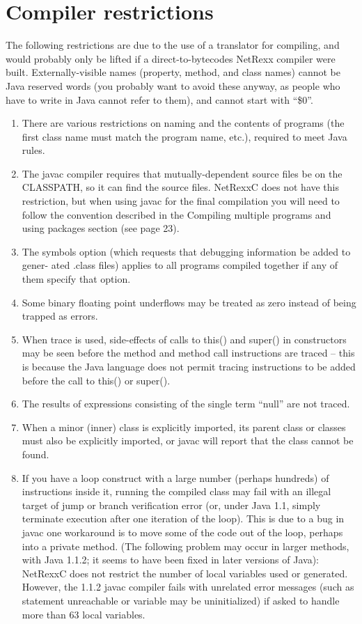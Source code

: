 \section{Compiler restrictions }
The following restrictions are due to the use of a translator for compiling, and would probably only be lifted if a direct-to-bytecodes NetRexx compiler were built. 
Externally-visible names (property, method, and class names) cannot be Java reserved words (you probably want to avoid these anyway, as people who have to write in Java cannot refer to them), and cannot start with “\$0”.
\begin{enumerate}
\item There are various restrictions on naming and the contents of programs (the first class name must match the program name, etc.), required to meet Java rules. 
\item The javac compiler requires that mutually-dependent source files be on the CLASSPATH, so it can find the source files. NetRexxC does not have this restriction, but when using javac for the final compilation you will need to follow the convention described in the Compiling multiple programs and using packages section (see page 23). 
\item The symbols option (which requests that debugging information be added to gener- ated .class files) applies to all programs compiled together if any of them specify that option. 
\item Some binary floating point underflows may be treated as zero instead of being trapped as errors. 
\item When trace is used, side-effects of calls to this() and super() in constructors may be seen before the method and method call instructions are traced – this is because the Java language does not permit tracing instructions to be added before the call to this() or super(). 
\item The results of expressions consisting of the single term “null” are not traced. 
\item When a minor (inner) class is explicitly imported, its parent class or classes must 
also be explicitly imported, or javac will report that the class cannot be found. 
\item If you have a loop construct with a large number (perhaps hundreds) of instructions inside it, running the compiled class may fail with an illegal target of jump or branch verification error (or, under Java 1.1, simply terminate execution after one iteration of the loop). This is due to a bug in javac one workaround is to move some of the code out of the loop, perhaps into a private method. 
(The following problem may occur in larger methods, with Java 1.1.2; it seems to have been fixed in later versions of Java): NetRexxC does not restrict the number of local variables used or generated. However, the 1.1.2 javac compiler fails with unrelated error messages (such as statement unreachable or variable may be uninitialized) if asked to handle more than 63 local variables. 
\end{enumerate}
